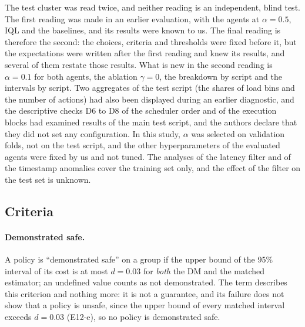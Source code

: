 The test cluster was read twice, and neither reading is an independent, blind test.%
The first reading was made in an earlier evaluation, with the agents at $\alpha=0.5$, IQL and the baselines, and its results were known to us.%
The final reading is therefore the second: the choices, criteria and thresholds were fixed before it, but the expectations were written after the first reading and knew its results, and several of them restate those results.%
What is new in the second reading is $\alpha=0.1$ for both agents, the ablation $\gamma=0$, the breakdown by script and the intervals by script.%
Two aggregates of the test script (the shares of load bins and the number of actions) had also been displayed during an earlier diagnostic, and the descriptive checks D6 to D8 of the scheduler order and of the execution blocks had examined results of the main test script, and the authors declare that they did not set any configuration.%
In this study, $\alpha$ was selected on validation folds, not on the test script, and the other hyperparameters of the evaluated agents were fixed by us and not tuned.%
The analyses of the latency filter and of the timestamp anomalies cover the training set only, and the effect of the filter on the test set is unknown.%

\subsection{Criteria}
\label{sec:criteria}

\paragraph{Demonstrated safe.}
A policy is ``demonstrated safe'' on a group if the upper bound of the 95\% interval of its cost is at most $d=0.03$ for \emph{both} the DM and the matched estimator; an undefined value counts as not demonstrated.%
The term describes this criterion and nothing more: it is not a guarantee, and its failure does not show that a policy is unsafe, since the upper bound of every matched interval exceeds $d=0.03$ (E12-e), so no policy is demonstrated safe.%

